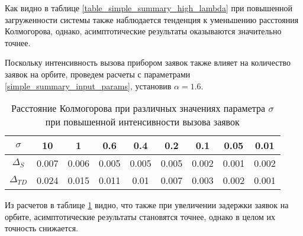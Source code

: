 Как видно в таблице \ref{table_simple_summary_high_lambda}  при повышенной загруженности системы также наблюдается тенденция к уменьшению расстояния Колмогорова, однако, асимптотические результаты оказываются значительно точнее.

Поскольку интенсивность вызова прибором заявок также влияет на количество заявок на орбите, проведем расчеты с параметрами \eqref{simple_summary_input_params}, установив $\alpha = 1.6$.

\begin{table}[h!] 
	\centering
	\caption{Расстояние Колмогорова при различных значениях параметра $\sigma$ при повышенной интенсивности вызова заявок}
	\label{table_simple_summary_high_alpha}
	\begin{tabular}{| c | c | c | c | c | c | c | c | c |}
		\hline
		$\sigma$ & 10 & 1 & 0.6 & 0.4 & 0.2 & 0.1 & 0.05 & 0.01 \\ 
		\hline
		$\Delta_S$ & 0.007 & 0.006 & 0.005 & 0.005 & 0.005 & 0.002 & 0.001 & 0.002\\
		\hline
		$\Delta_{TD}$ & 0.024 & 0.015 & 0.011 & 0.01 & 0.007 & 0.003 & 0.002 & 0.001\\
		\hline
	\end{tabular}
\end{table}

Из расчетов в таблице \ref{table_simple_summary_high_alpha} видно, что также при увеличении задержки заявок на орбите, асимптотические результаты становятся точнее, однако в целом их точность снижается.

